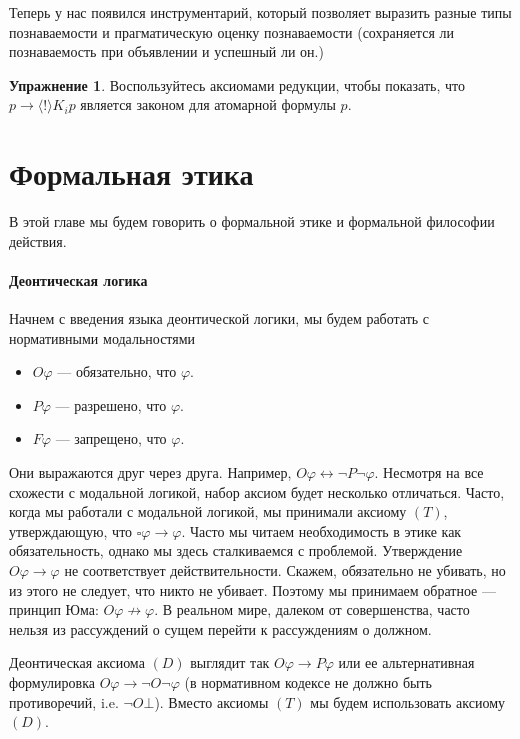 \documentclass[openany]{book}
\theoremstyle{plain}
\theoremstyle{definition}
\newtheorem{xrc}{Упражнение}[]
\begin{document}
Теперь у нас появился инструментарий, который позволяет выразить разные типы познаваемости и прагматическую оценку познаваемости (сохраняется ли познаваемость при объявлении и успешный ли он.)

\begin{xrc}
    Воспользуйтесь аксиомами редукции, чтобы показать, что \(p \to \langle ! \rangle K_i p\) является законом для атомарной формулы \(p\).
\end{xrc}



\chapter{Формальная этика}

В этой главе мы будем говорить о формальной этике и формальной философии действия.

\subsubsection{Деонтическая логика}

Начнем с введения языка деонтической логики, мы будем работать с нормативными модальностями 
\begin{itemize}
    \item \(O \varphi\) --- обязательно, что \(\varphi\).
    \item \(P \varphi\) --- разрешено, что \(\varphi\).
    \item \(F \varphi\) --- запрещено, что \(\varphi\).
\end{itemize}

Они выражаются друг через друга. Например, \(O \varphi \leftrightarrow \neg P \neg \varphi\).
Несмотря на все схожести с модальной логикой, набор аксиом будет несколько отличаться. Часто, когда мы работали с модальной логикой, мы принимали аксиому \((T)\), утверждающую, что \(\square \varphi \to \varphi\). Часто мы читаем необходимость в этике как обязательность, однако мы здесь сталкиваемся с проблемой. Утверждение \(O \varphi \to \varphi\) не соответствует действительности. Скажем, обязательно не убивать, но из этого не следует, что никто не убивает. Поэтому мы принимаем обратное --- принцип Юма: \(O \varphi \not\to \varphi\). В реальном мире, далеком от совершенства, часто нельзя из рассуждений о сущем перейти к рассуждениям о должном. 

Деонтическая аксиома \((D)\) выглядит так \(O \varphi \to P \varphi\) или ее альтернативная формулировка \(O \varphi \to \neg O \neg \varphi\) (в нормативном кодексе не должно быть противоречий, i.e. \(\neg O \bot\)). Вместо аксиомы \((T)\) мы будем использовать аксиому \((D)\).
\end{document}
